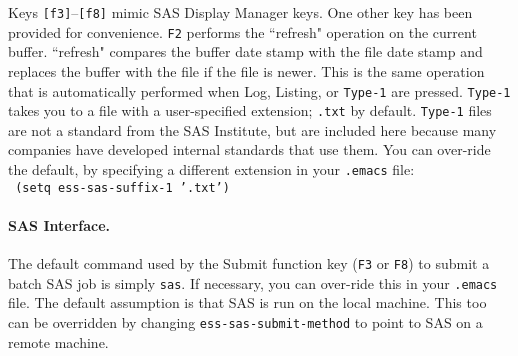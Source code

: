 \documentclass{article}
\newcommand{\stexttt}[1]{{\small\texttt{#1}}}
\newcommand{\elcode}[1]{\\{\stexttt{\hspace*{2em} #1}}\\}
\newenvironment{Salltt}{\small\begin{alltt}}{\end{alltt}}
\begin{document}
Keys \stexttt{[f3]}--\stexttt{[f8]} mimic SAS Display Manager keys.
One other key has been provided for convenience.  \stexttt{F2}
performs the ``refresh" operation on the current buffer.  ``refresh"
compares the buffer date stamp with the file date stamp and replaces
the buffer with the file if the file is newer.  This is the same
operation that is automatically performed when Log, Listing, or
\stexttt{Type-1} are pressed.  \stexttt{Type-1} takes you to a file
with a user-specified extension; \stexttt{.txt} by default.
\stexttt{Type-1} files are not a standard from the SAS Institute, but
are included here because many companies have developed internal
standards that use them.  You can over-ride the default, by specifying
a different extension in your \stexttt{.emacs} file:
\elcode{(setq ess-sas-suffix-1 '.txt')}

\paragraph{SAS Interface.}
\label{sec:SAS:interface}

The default command used by the Submit function key (\stexttt{F3} or \stexttt{F8}) to
submit a batch SAS job is simply \stexttt{sas}.  If necessary, you can
over-ride this in your \stexttt{.emacs} file.
The default assumption is that SAS is run on the local machine.  This too
can be overridden by changing \stexttt{ess-sas-submit-method} to point to
SAS on a remote machine.

\end{document}
